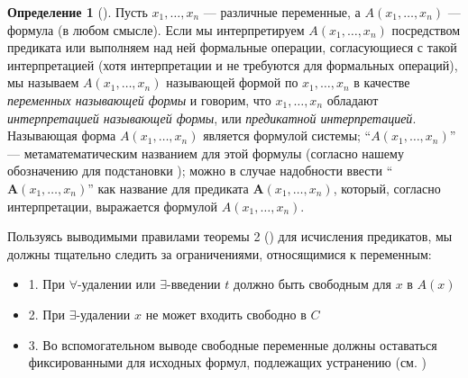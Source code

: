 \documentclass[a4paper, 12pt]{article}  %
\theoremstyle{definition}
\newtheorem*{definition}{Определение}
\begin{document}
	\begin{definition}[]
		 Пусть $x_1, \dots, x_n$ --- различные переменные, а $A(x_1, \dots, x_n)$ --- формула (в
		 любом смысле). Если мы интерпретируем $A(x_1, \dots, x_n)$ посредством предиката или
		 выполняем над ней формальные операции, согласующиеся с такой интерпретацией (хотя
		 интерпретации и не требуются для формальных операций), мы называем $A(x_1, \dots, x_n)$
		 называющей формой по $x_1, \dots, x_n$ в качестве \textit{переменных называющей формы} и
		 говорим, что $x_1, \dots, x_n$ обладают \textit{интерпретацией называющей формы}, или
		 \textit{предикатной интерпретацией}. Называющая форма $A(x_1, \dots, x_n)$ является формулой
		 системы; ``$A(x_1, \dots, x_n)$'' --- метаматематическим названием для этой формулы
		 (согласно нашему обозначению для подстановки ); можно в случае надобности
		 ввести ``$\textbf{A}(x_1, \dots, x_n)$'' как название для предиката 
		 $\textbf{A}(x_1, \dots, x_n)$, который, согласно интерпретации, выражается формулой 
		 $A(x_1, \dots, x_n)$.
	\end{definition}
	
	Пользуясь выводимыми правилами теоремы 2 () для исчисления предикатов, мы должны
	тщательно следить за ограничениями, относящимися к переменным: 
	\begin{itemize}[label={}]
		\setlength\itemsep{0pt}
		\item 1. При $\forall$-удалении или $\exists$-введении $t$ должно быть свободным для $x$ в $A(x)$ 
		\item 2. При $\exists$-удалении $x$ не может входить свободно в $C$
		\item 3. Во вспомогательном выводе свободные переменные должны оставаться фиксированными для исходных формул, подлежащих устранению (см. )
	\end{itemize}
	
\end{document}
